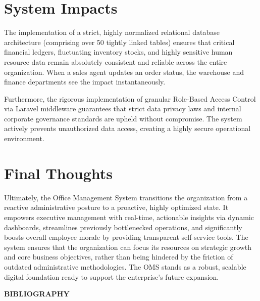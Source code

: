 ﻿\documentclass[12pt,a4paper]{report}
\begin{document}
\section*{System Impacts}
The implementation of a strict, highly normalized relational database architecture (comprising over 50 tightly linked tables) ensures that critical financial ledgers, fluctuating inventory stocks, and highly sensitive human resource data remain absolutely consistent and reliable across the entire organization. When a sales agent updates an order status, the warehouse and finance departments see the impact instantaneously.

Furthermore, the rigorous implementation of granular Role-Based Access Control via Laravel middleware guarantees that strict data privacy laws and internal corporate governance standards are upheld without compromise. The system actively prevents unauthorized data access, creating a highly secure operational environment.

\section*{Final Thoughts}
Ultimately, the Office Management System transitions the organization from a reactive administrative posture to a proactive, highly optimized state. It empowers executive management with real-time, actionable insights via dynamic dashboards, streamlines previously bottlenecked operations, and significantly boosts overall employee morale by providing transparent self-service tools. The system ensures that the organization can focus its resources on strategic growth and core business objectives, rather than being hindered by the friction of outdated administrative methodologies. The OMS stands as a robust, scalable digital foundation ready to support the enterprise's future expansion.

\newpage
\vspace*{\fill}
\begin{center}
{\LARGE \textbf{BIBLIOGRAPHY}}
\end{center}
\vspace*{\fill}
\end{document}
